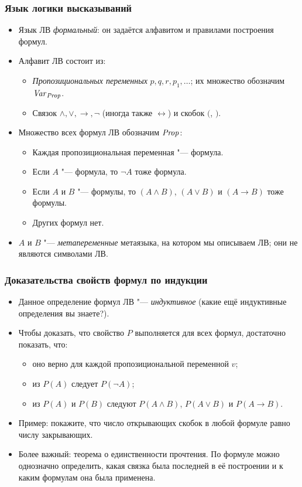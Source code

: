 \documentclass[10pt]{beamer}
\begin{document}
\begin{frame}
    \frametitle{Язык логики высказываний}
    \begin{itemize}
        \item Язык ЛВ \emph{формальный}: он задаётся алфавитом и правилами построения формул.
        \pause
        \item Алфавит ЛВ состоит из:
        \begin{itemize}
            \item \emph{Пропозициональных переменных} $p, q, r, p_1,\ldots$; их множество обозначим $\mathit{Var}_{\mathit{Prop}}$.
            \item Связок $\land, \lor, \to, \neg$ (иногда также $\leftrightarrow$) и скобок $($, $)$.
        \end{itemize}
        \pause
        \item Множество всех формул ЛВ обозначим $\mathit{Prop}$:
        \begin{itemize}
            \item Каждая пропозициональная переменная "--- формула.
            \item Если $A$ "--- формула, то $\neg A$ тоже формула.
            \item Если $A$ и $B$ "--- формулы, то $(A \land B)$, $(A \lor B)$ и $(A \to B)$ тоже формулы.
            \item Других формул нет.
        \end{itemize}
        \pause
        \item $A$ и $B$ "--- \emph{метапеременные} метаязыка, на котором мы описываем ЛВ; они не являются символами ЛВ.
    \end{itemize}
\end{frame}

\begin{frame}
    \frametitle{Доказательства свойств формул по индукции}
    \begin{itemize}
        \item Данное определение формул ЛВ "--- \emph{индуктивное} (какие ещё индуктивные определения вы знаете?).
        \item Чтобы доказать, что свойство $P$ выполняется для всех формул, достаточно показать, что:
        \pause
        \begin{itemize}
            \item оно верно для каждой пропозициональной переменной $v$;
            \item из $P(A)$ следует $P(\neg A)$;
            \item из $P(A)$ и $P(B)$ следуют $P(A \land B)$, $P(A \lor B)$ и $P(A \to B)$.
        \end{itemize}
        \pause
        \item Пример: покажите, что число открывающих скобок в любой формуле равно числу закрывающих.
        \pause
        \item Более важный: теорема о единственности прочтения. По формуле можно однозначно определить, какая связка была последней в её построении и к каким формулам она была применена.
    \end{itemize}
\end{frame}
\end{document}
